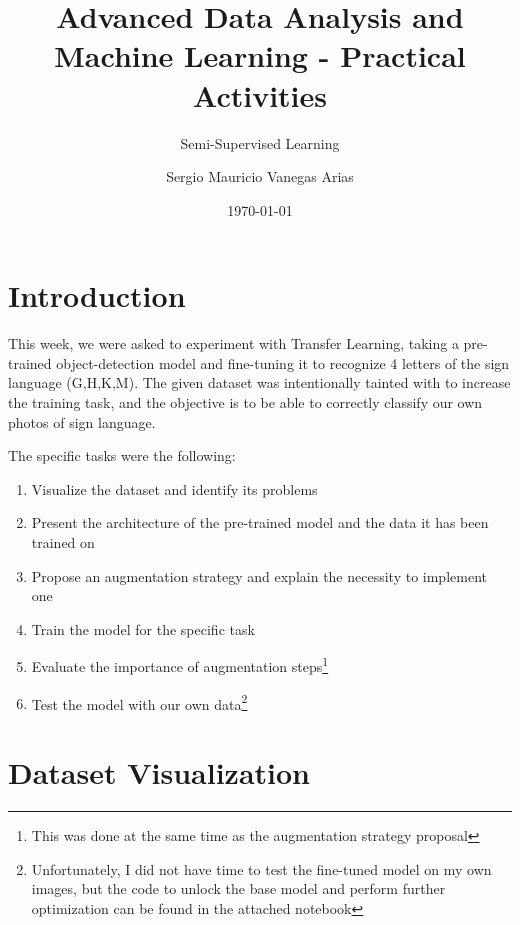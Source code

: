 \documentclass{scrartcl}
\title{Advanced Data Analysis and Machine Learning - Practical Activities}
\subtitle{Semi-Supervised Learning}
\author{Sergio Mauricio Vanegas Arias}
\date{\today}
\begin{document}
\maketitle

\section{Introduction}

  This week, we were asked to experiment with Transfer Learning, taking a pre-trained object-detection model and fine-tuning it to recognize 4 letters of the sign language (G,H,K,M). The given dataset was intentionally tainted with to increase the training task, and the objective is to be able to correctly classify our own photos of sign language.

  The specific tasks were the following:
  \begin{enumerate}
    \item Visualize the dataset and identify its problems
    \item Present the architecture of the pre-trained model and the data it has been trained on
    \item Propose an augmentation strategy and explain the necessity to implement one
    \item Train the model for the specific task
    \item Evaluate the importance of augmentation steps\footnote{This was done at the same time as the augmentation strategy proposal}
    \item Test the model with our own data\footnote{Unfortunately, I did not have time to test the fine-tuned model on my own images, but the code to unlock the base model and perform further optimization can be found in the attached notebook}
  \end{enumerate}

\section{Dataset Visualization}
\end{document}
